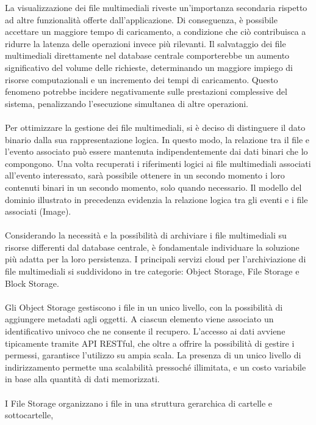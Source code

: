 La visualizzazione dei file multimediali riveste un'importanza secondaria
rispetto ad altre funzionalità offerte dall'applicazione.
Di conseguenza, è possibile accettare un maggiore tempo di caricamento, 
a condizione che ciò contribuisca a ridurre la latenza delle operazioni invece più rilevanti. 
Il salvataggio dei file multimediali direttamente nel database centrale 
comporterebbe un aumento significativo del volume delle richieste, 
determinando un maggiore impiego di risorse computazionali e un incremento dei tempi di caricamento. 
Questo fenomeno potrebbe incidere negativamente sulle prestazioni complessive del sistema, 
penalizzando l'esecuzione simultanea di altre operazioni.\\
\\
Per ottimizzare la gestione dei file multimediali, 
si è deciso di distinguere il dato binario dalla sua rappresentazione logica. 
In questo modo, la relazione tra il file e l'evento associato può essere mantenuta 
indipendentemente dai dati binari che lo compongono. 
Una volta recuperati i riferimenti logici ai file multimediali associati all'evento interessato, 
sarà possibile ottenere in un secondo momento i loro contenuti binari in un secondo momento, 
solo quando necessario.
Il modello del dominio illustrato in precedenza evidenzia 
la relazione logica tra gli eventi e i file associati (Image).\\
\\
Considerando la necessità e la possibilità di archiviare i file multimediali 
su risorse differenti dal database centrale, 
è fondamentale individuare la soluzione più adatta per la loro persistenza. 
I principali servizi cloud per l'archiviazione di file multimediali si suddividono in tre categorie: 
Object Storage, File Storage e Block Storage.\\
\\
Gli Object Storage gestiscono i file in un unico livello, 
con la possibilità di aggiungere metadati agli oggetti. 
A ciascun elemento viene associato un identificativo univoco che ne consente il recupero. 
L'accesso ai dati avviene tipicamente tramite API RESTful, 
che oltre a offrire la possibilità di gestire i permessi, 
garantisce l'utilizzo su ampia scala. 
La presenza di un unico livello di indirizzamento permette una scalabilità pressoché illimitata, 
e un costo variabile in base alla quantità di dati memorizzati.\\
\\
I File Storage organizzano i file in una struttura gerarchica di cartelle e sottocartelle, 
